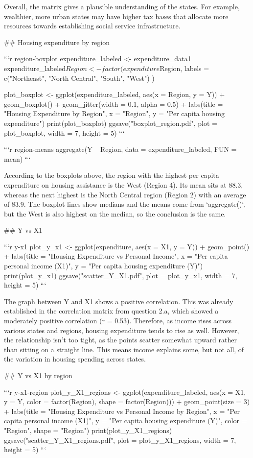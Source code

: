 Overall, the matrix gives a plausible understanding of the states. For example, wealthier, more urban states may have higher tax bases that allocate more resources towards establishing social service infrastructure.

## Housing expenditure by region

```{r region-boxplot}
expenditure_labeled <- expenditure_data1
expenditure_labeled$Region <- factor(
  expenditure$Region,
  labels = c("Northeast", "North Central", "South", "West")
)

plot_boxplot <- ggplot(expenditure_labeled, aes(x = Region, y = Y)) +
  geom_boxplot() +
  geom_jitter(width = 0.1, alpha = 0.5) +
  labs(title = "Housing Expenditure by Region",
       x = "Region",
       y = "Per capita housing expenditure")
print(plot_boxplot)
ggsave("boxplot_region.pdf", plot = plot_boxplot, width = 7, height = 5)
```

```{r region-means}
aggregate(Y ~ Region, data = expenditure_labeled, FUN = mean)
```

According to the boxplots above, the region with the highest per capita expenditure on housing assistance is the West (Region 4). Its mean sits at 88.3, whereas the next highest is the North Central region (Region 2) with an average of 83.9. The boxplot lines show medians and the means come from `aggregate()`, but the West is also highest on the median, so the conclusion is the same.

## Y vs X1

```{r y-x1}
plot_y_x1 <- ggplot(expenditure, aes(x = X1, y = Y)) +
  geom_point() +
  labs(title = "Housing Expenditure vs Personal Income",
       x = "Per capita personal income (X1)",
       y = "Per capita housing expenditure (Y)")
print(plot_y_x1)
ggsave("scatter_Y_X1.pdf", plot = plot_y_x1, width = 7, height = 5)
```

The graph between Y and X1 shows a positive correlation. This was already established in the correlation matrix from question 2.a, which showed a moderately positive correlation (r = 0.53). Therefore, as income rises across various states and regions, housing expenditure tends to rise as well. However, the relationship isn’t too tight, as the points scatter somewhat upward rather than sitting on a straight line. This means income explains some, but not all, of the variation in housing spending across states.

## Y vs X1 by region

```{r y-x1-region}
plot_y_X1_regions <- ggplot(expenditure_labeled,
                            aes(x = X1, y = Y, color = factor(Region), shape = factor(Region))) +
  geom_point(size = 3) +
  labs(title = "Housing Expenditure vs Personal Income by Region",
       x = "Per capita personal income (X1)",
       y = "Per capita housing expenditure (Y)",
       color = "Region",
       shape = "Region")
print(plot_y_X1_regions)
ggsave("scatter_Y_X1_regions.pdf", plot = plot_y_X1_regions, width = 7, height = 5)
```

